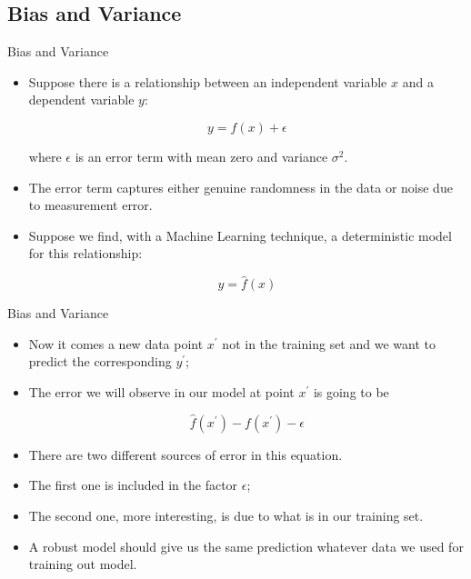 \documentclass[11pt]{beamer}
\begin{document}
\subsection[subsection]{Bias and Variance}
%
\begin{frame}{Bias and Variance}
\begin{itemize}
\item Suppose there is a relationship between an independent variable $x$ and a dependent variable $y$:

\begin{equation}
    y=f(x) + \epsilon
\end{equation}

where $\epsilon$ is an error term with mean zero and variance $\sigma^2$. 

\item The error term captures either genuine randomness in the data or noise due to measurement error.

\item Suppose we find, with a Machine Learning technique,  a deterministic model for this relationship:

\begin{equation}
    y = \hat f(x)
\end{equation}
 
\end{itemize}
\end{frame}
\begin{frame}{Bias and Variance}
\begin{itemize}
\item Now it comes a new data point $x^\prime$ not in the training set and we want to predict the corresponding $y^\prime$;

\item The error we will observe in our model at point $x^\prime$ is going to be

\begin{equation}
    \hat f(x^\prime) - f(x^\prime) - \epsilon
\end{equation}

\item There are two different sources of error in this equation. 

\item The first one is included in the factor $\epsilon$; 

\item The second one, more interesting, is due to what is in our training set. 

\item A robust model should give us the same prediction whatever data we used for training out model.
\end{itemize}
\end{frame}
\end{document}
